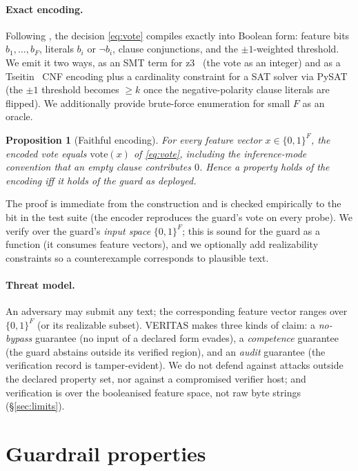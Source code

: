 \documentclass[11pt]{article}
\newtheorem{proposition}{Proposition}
\begin{document}
\paragraph{Exact encoding.} Following \citet{przybysz2023verifying}, the decision
\eqref{eq:vote} compiles exactly into Boolean form: feature bits $b_1,\dots,b_F$,
literals $b_i$ or $\neg b_i$, clause conjunctions, and the $\pm1$-weighted threshold.
We emit it two ways, as an SMT term for z3~\citep{demoura2008z3} (the vote as an
integer) and as a Tseitin~\citep{tseitin1983complexity} CNF encoding plus a
cardinality constraint for a SAT solver via PySAT~\citep{ignatiev2018pysat} (the
$\pm1$ threshold becomes $\ge k$ once the negative-polarity clause literals are
flipped). We additionally provide brute-force enumeration for small $F$ as an oracle.

\begin{proposition}[Faithful encoding]\label{prop:faithful}
For every feature vector $x\in\{0,1\}^F$, the encoded vote equals
$\mathrm{vote}(x)$ of \eqref{eq:vote}, including the inference-mode convention that
an empty clause contributes $0$. Hence a property holds of the encoding iff it
holds of the guard as deployed.
\end{proposition}
The proof is immediate from the construction and is checked empirically to the bit
in the test suite (the encoder reproduces the guard's vote on every probe). We
verify over the guard's \emph{input space} $\{0,1\}^F$; this is sound for the guard
as a function (it consumes feature vectors), and we optionally add realizability
constraints so a counterexample corresponds to plausible text.

\paragraph{Threat model.} An adversary may submit any text; the corresponding
feature vector ranges over $\{0,1\}^F$ (or its realizable subset). VERITAS makes
three kinds of claim: a \emph{no-bypass} guarantee (no input of a declared form
evades), a \emph{competence} guarantee (the guard abstains outside its verified
region), and an \emph{audit} guarantee (the verification record is tamper-evident).
We do not defend against attacks outside the declared property set, nor against a
compromised verifier host; and verification is over the booleanised feature space,
not raw byte strings (\S\ref{sec:limits}).

\section{Guardrail properties}
\label{sec:props}
\end{document}
